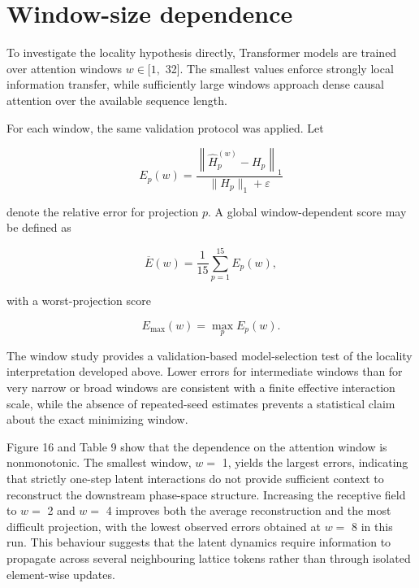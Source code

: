 \section{Window-size dependence}
\label{sec:05_results_window_size_dependence}

To investigate the locality hypothesis directly, Transformer models are trained over attention windows \(w \in [ 1 ,\) 32]. The smallest values enforce strongly local information transfer, while sufficiently large windows approach dense causal attention over the available sequence length.

For each window, the same validation protocol was applied. Let

\begin{equation}
\label{eq:205}
E_p(w)=\frac{\left\|\widehat H_p^{(w)}-H_p\right\|_1}{\|H_p\|_1+\varepsilon}
\end{equation}

denote the relative error for projection \(p .\) A global window-dependent score may be defined as

\begin{equation}
\label{eq:206}
\overline E(w)=\frac1{15}\sum_{p=1}^{15}E_p(w),
\end{equation}

with a worst-projection score

\begin{equation}
\label{eq:207}
E_{\max}(w)=\max_p E_p(w).
\end{equation}

The window study provides a validation-based model-selection test of the locality interpretation developed above. Lower errors for intermediate windows than for very narrow or broad windows are consistent with a finite effective interaction scale, while the absence of repeated-seed estimates prevents a statistical claim about the exact minimizing window.

Figure 16 and Table 9 show that the dependence on the attention window is nonmonotonic. The smallest window, \(w =\) 1, yields the largest errors, indicating that strictly one-step latent interactions do not provide sufficient context to reconstruct the downstream phase-space structure. Increasing the receptive field to \(w =\) 2 and \(w =\) 4 improves both the average reconstruction and the most difficult projection, with the lowest observed errors obtained at \(w =\) 8 in this run. This behaviour suggests that the latent dynamics require information to propagate across several neighbouring lattice tokens rather than through isolated element-wise updates.

